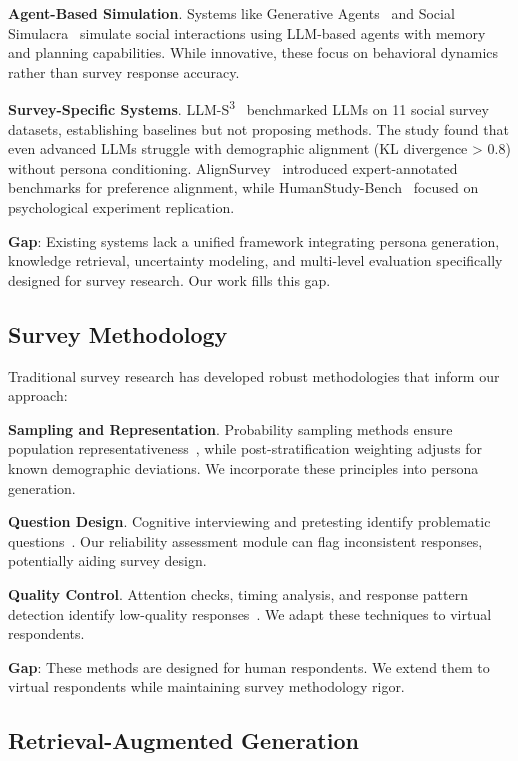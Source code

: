 \documentclass[sigconf,nonarchival]{acmart}
\begin{document}
\textbf{Agent-Based Simulation}. Systems like Generative Agents~\cite{park2023generative} and Social Simulacra~\cite{park2022social} simulate social interactions using LLM-based agents with memory and planning capabilities. While innovative, these focus on behavioral dynamics rather than survey response accuracy.

\textbf{Survey-Specific Systems}. LLM-S\textsuperscript{3}~\cite{llms3} benchmarked LLMs on 11 social survey datasets, establishing baselines but not proposing methods. The study found that even advanced LLMs struggle with demographic alignment (KL divergence > 0.8) without persona conditioning. AlignSurvey~\cite{alignsurvey} introduced expert-annotated benchmarks for preference alignment, while HumanStudy-Bench~\cite{humanstudy} focused on psychological experiment replication.

\textbf{Gap}: Existing systems lack a unified framework integrating persona generation, knowledge retrieval, uncertainty modeling, and multi-level evaluation specifically designed for survey research. Our work fills this gap.

\subsection{Survey Methodology}

Traditional survey research has developed robust methodologies that inform our approach:

\textbf{Sampling and Representation}. Probability sampling methods ensure population representativeness~\cite{kish1965survey}, while post-stratification weighting adjusts for known demographic deviations. We incorporate these principles into persona generation.

\textbf{Question Design}. Cognitive interviewing and pretesting identify problematic questions~\cite{presser2004methods}. Our reliability assessment module can flag inconsistent responses, potentially aiding survey design.

\textbf{Quality Control}. Attention checks, timing analysis, and response pattern detection identify low-quality responses~\cite{curry2019validating}. We adapt these techniques to virtual respondents.

\textbf{Gap}: These methods are designed for human respondents. We extend them to virtual respondents while maintaining survey methodology rigor.

\subsection{Retrieval-Augmented Generation}
\end{document}
